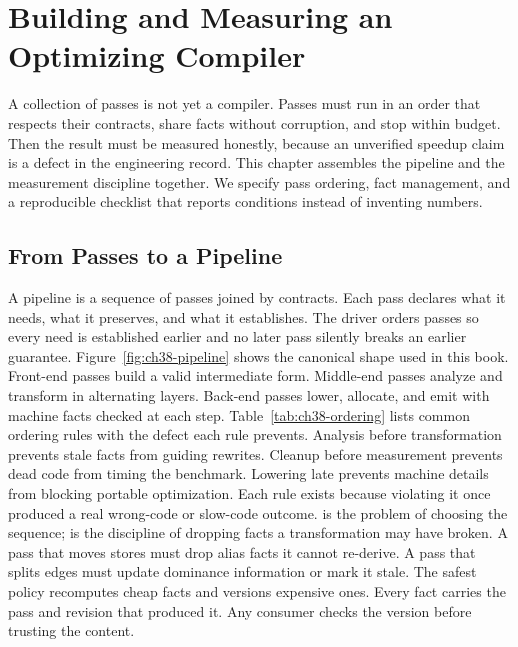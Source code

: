 \chapter{Building and Measuring an Optimizing Compiler}\label{ch:building-measuring-optimizing-compiler}

A collection of passes is not yet a compiler.
Passes must run in an order that respects their contracts, share facts without corruption, and stop within budget.
Then the result must be measured honestly, because an unverified speedup claim is a defect in the engineering record.
This chapter assembles the pipeline and the measurement discipline together.
We specify pass ordering, fact management, and a reproducible checklist that reports conditions instead of inventing numbers.

\section{From Passes to a Pipeline}\label{sec:ch38-pipeline}

A pipeline is a sequence of passes joined by contracts.
Each pass declares what it needs, what it preserves, and what it establishes.
The driver orders passes so every need is established earlier and no later pass silently breaks an earlier guarantee.
Figure~\ref{fig:ch38-pipeline} shows the canonical shape used in this book.
Front-end passes build a valid intermediate form.
Middle-end passes analyze and transform in alternating layers.
Back-end passes lower, allocate, and emit with machine facts checked at each step.
Table~\ref{tab:ch38-ordering} lists common ordering rules with the defect each rule prevents.
Analysis before transformation prevents stale facts from guiding rewrites.
Cleanup before measurement prevents dead code from timing the benchmark.
Lowering late prevents machine details from blocking portable optimization.
Each rule exists because violating it once produced a real wrong-code or slow-code outcome.
 is the problem of choosing the sequence;  is the discipline of dropping facts a transformation may have broken.
A pass that moves stores must drop alias facts it cannot re-derive.
A pass that splits edges must update dominance information or mark it stale.
The safest policy recomputes cheap facts and versions expensive ones.
Every fact carries the pass and revision that produced it.
Any consumer checks the version before trusting the content.

